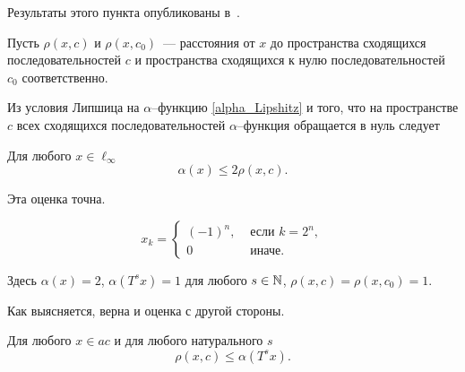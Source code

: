 Результаты этого пункта опубликованы в~\cite{our-mz2019ac0}.

Пусть $\rho(x,c)$ и $\rho(x,c_0)$~--- расстояния от $x$ до пространства сходящихся последовательностей $c$
и пространства сходящихся к нулю последовательностей $c_0$ соответственно.

Из условия Липшица на $\alpha$--функцию \eqref{alpha_Lipshitz}
и того, что на пространстве $c$
всех сходящихся последовательностей
$\alpha$--функция обращается в нуль следует

\begin{lemma}
\label{thm:alpha_x_leq_2_rho_x_c}
	Для любого $x\in\ell_\infty$
	\begin{equation}
		\alpha(x) \leq 2\rho(x, c)
		.
	\end{equation}
\end{lemma}


Эта оценка точна.
\begin{example}
\label{ex:alpha_ac_rho_x_c}
	\begin{equation}
	\label{eq:alpha_ac_distance_example_y}
		x_k = \begin{cases}
			(-1)^n, &\mbox{~если~} k = 2^n,
			\\
			0 &\mbox{~иначе.}
		\end{cases}
	\end{equation}
\end{example}
Здесь $\alpha(x) = 2$, $\alpha(T^s x) = 1$ для любого $s\in\mathbb{N}$, $\rho(x,c) = \rho(x, c_0) = 1$.

Как выясняется, верна и оценка с другой стороны.

\begin{lemma}
\label{thm:rho_x_c_leq_alpha_t_s_x}
	Для любого $x\in ac$ и для любого натурального $s$
	\begin{equation}
		\rho(x,c)\leq \alpha(T^s x)
		.
	\end{equation}
\end{lemma}

